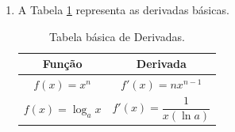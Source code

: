 \documentclass[a4paper, 12pt]{article}
\begin{document}
\begin{enumerate}
\begin{center}
    \end{center}
    
    \item A Tabela \ref{minha-tabela} representa as derivadas básicas.
    
    \begin{table}[!htb] %
    
    \centering
    
        \begin{tabular}{c||c} 
        \hline 
        Função & Derivada\\ \hline \hline 
        $f(x) = x^n$     & $f'(x) = nx^{n-1}$ \\ \hline \hline
        $f(x) = \log_a x$ & $f'(x) = \dfrac{1}{x (\ln a)}$ \\ \hline
        \end{tabular}
    
    \caption{Tabela básica de Derivadas.} %
    \label{minha-tabela} %
    \end{table}
    
    
\end{enumerate}
\end{document}
